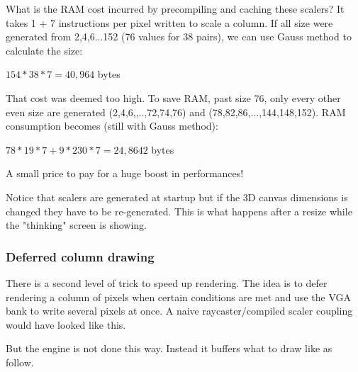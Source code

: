 \par
What is the RAM cost incurred by precompiling and caching these scalers? It takes 1 + 7 instructions per pixel written to scale a column. If all size were generated from 2,4,6...152 (76 values for 38 pairs), we can use Gauss method to calculate the size:\\
\par
$154*38*7=40,964$ bytes\\
\par
That cost was deemed too high. To save RAM, past size 76, only every other even size are generated (2,4,6,,..,72,74,76) and (78,82,86,...,144,148,152). RAM consumption becomes (still with Gauss method):\\
\par
$78*19*7+9*230*7=24,8642$ bytes\\
\par
A small price to pay for a huge boost in performances!\\
\par
Notice that scalers are generated at startup but if the 3D canvas dimensions is changed they have to be re-generated. This is what happens after a resize while the "thinking" screen is showing.
\begin{figure}[H]
 \centering
\end{figure}








\subsubsection{Deferred column drawing}
There is a second level of trick to speed up rendering. The idea is to defer rendering a column of pixels when certain conditions are met and use the VGA bank to write several pixels at once. A naive raycaster/compiled scaler coupling would have looked like this.\\

\begin{minipage}{\textwidth}

\end{minipage}
\par
But the engine is not done this way. Instead it buffers what to draw like as follow.\\
\par
\begin{minipage}{\textwidth}

\end{minipage}


